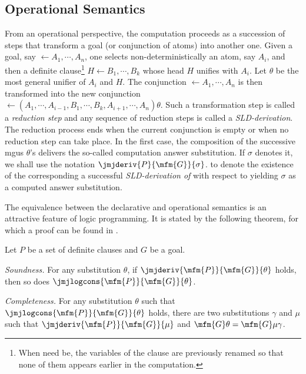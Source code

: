 \subsection{Operational Semantics}

\begin{sloppypar}
From an operational perspective, the computation proceeds
as a succession of steps that transform a goal (or conjunction of atoms)
into another one. Given a goal, say
\( \leftarrow A_{1}, \cdots, A_{n} \),
one selects non-deterministically an atom, say $A_i$, and then a
definite clause\footnote{%
  When need be, the variables of the clause are previously
  renamed so that none of them appears earlier in the computation.
}
\( H \leftarrow B_{1},  \cdots , B_{k} \)
whose head $H$ unifies with $A_i$.
Let $\theta$ be the most general unifier of $A_{i}$ and $H$.  The
conjunction
\( \leftarrow A_{1}, \cdots, A_{n} \)
is then transformed into the new conjunction 
 \( \leftarrow ( A_{1}, \cdots, A_{i-1}, B_{1},
 \cdots, B_{k}, A_{i+1}, \cdots, A_{n} ) \theta.  \)
 Such a transformation step is called a \textit{reduction step} and any
 sequence of reduction steps is called a \textit{SLD-derivation}.  The
 reduction process ends when the current conjunction is empty or when
 no reduction step can take place. In the first case, the composition of the successive mgus $\theta$'s delivers the so-called computation answer substitution. If $\sigma$ denotes it, we shall use the notation
\( \jmjderiv{P}{\mfm{G}}{\sigma} \).
 to denote the existence of the corresponding a successful {\em SLD-derivation of\/}  with respect to 
 yielding $\sigma$ as a computed answer substitution. 
 \end{sloppypar}

The equivalence between the declarative and operational semantics is
an attractive feature of logic programming.  It
is stated by the following theorem, for which a proof can be found in
\cite{Lloyd}.


\begin{thm}
Let $P$ be a set of definite clauses and $G$ be a goal.

\begin{thmprop}

\item
{\em Soundness.\/}
For any substitution $\theta$, if 
\( \jmjderiv{ \mfm{P} }{ \mfm{G} }{ \theta } \)
holds, then so does
\( \jmjlogcons{ \mfm{P} }{ \mfm{G} }{ \theta } \).

\item
{\em Completeness.\/}
For any substitution $\theta$ such that
\( \jmjlogcons{ \mfm{P} }{ \mfm{G} }{ \theta } \)
holds, there are two substitutions $\gamma$ and $\mu$ such that 
\( \jmjderiv { \mfm{P} }{ \mfm{G} }{ \mu } \)
and
\( \mfm{G}\theta = \mfm{G}\mu\gamma \).

\end{thmprop}
\end{thm}
